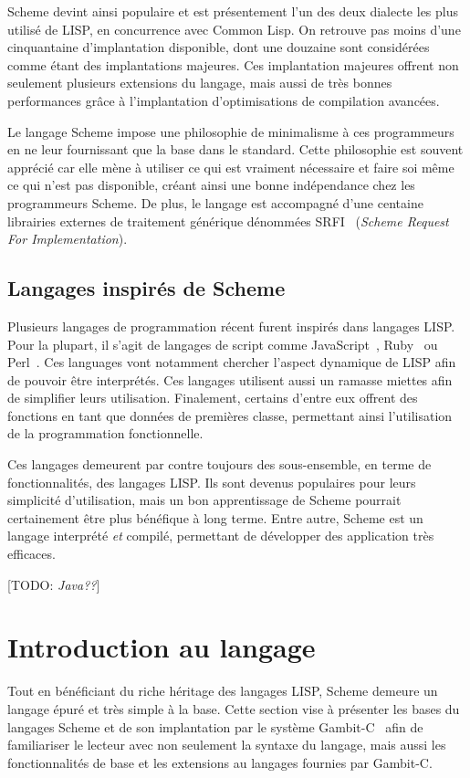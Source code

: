 \documentclass[12pt,oneside,letterpaper,francais]{book}
\newcommand{\todo}[1]{[TODO: {\it #1}]}
\begin{document}
Scheme devint ainsi populaire et est présentement l'un des deux
dialecte les plus utilisé de LISP, en concurrence avec Common Lisp. On
retrouve pas moins d'une cinquantaine d'implantation disponible, dont
une douzaine sont considérées comme étant des implantations
majeures. Ces implantation majeures offrent non seulement plusieurs
extensions du langage, mais aussi de très bonnes performances grâce à
l'implantation d'optimisations de compilation avancées.

Le langage Scheme impose une philosophie de minimalisme à ces
programmeurs en ne leur fournissant que la base dans le
standard. Cette philosophie est souvent apprécié car elle mène à
utiliser ce qui est vraiment nécessaire et faire soi même ce qui n'est
pas disponible, créant ainsi une bonne indépendance chez les
programmeurs Scheme. De plus, le langage est accompagné d'une centaine
librairies externes de traitement générique dénommées SRFI~\cite{SRFI}
(\textit{Scheme Request For Implementation}).

\subsection{Langages inspirés de Scheme}

Plusieurs langages de programmation récent furent inspirés dans
langages LISP. Pour la plupart, il s'agit de langages de script comme
JavaScript~\cite{ECMA-262}, Ruby~\cite{RUBY} ou Perl~\cite{PERL}. Ces
languages vont notamment chercher l'aspect dynamique de LISP afin de
pouvoir être interprétés. Ces langages utilisent aussi un ramasse
miettes afin de simplifier leurs utilisation. Finalement, certains
d'entre eux offrent des fonctions en tant que données de premières
classe, permettant ainsi l'utilisation de la programmation
fonctionnelle. 

Ces langages demeurent par contre toujours des sous-ensemble, en terme
de fonctionnalités, des langages LISP. Ils sont devenus populaires
pour leurs simplicité d'utilisation, mais un bon apprentissage de
Scheme pourrait certainement être plus bénéfique à long terme. Entre
autre, Scheme est un langage interprété \emph{et} compilé, permettant
de développer des application très efficaces.


\todo{Java??}


\section{Introduction au langage}
Tout en bénéficiant du riche héritage des langages LISP, Scheme
demeure un langage épuré et très simple à la base. Cette section vise
à présenter les bases du langages Scheme et de son implantation par le
système Gambit-C~\cite{Gambit4} afin de familiariser le lecteur avec
non seulement la syntaxe du langage, mais aussi les fonctionnalités de
base et les extensions au langages fournies par Gambit-C.
\end{document}
